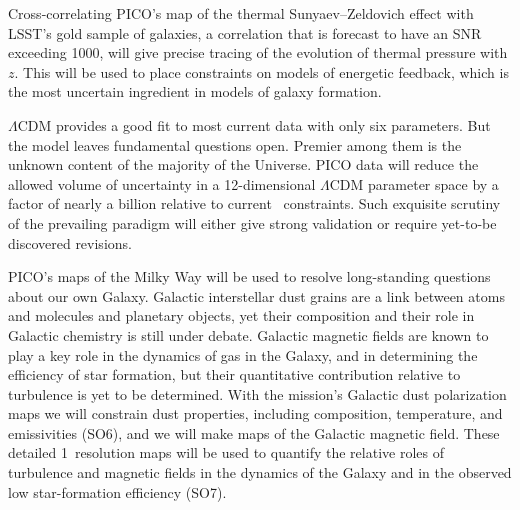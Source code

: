 \documentclass[PICOReport.tex]{subfiles}
\begin{document}
Cross-correlating PICO's map of the thermal Sunyaev--Zeldovich effect with LSST's gold sample of galaxies, a correlation that is forecast to have an \ac{SNR} exceeding 1000, will give precise tracing of the evolution of thermal pressure with $z$. This will be used to place constraints on models of energetic feedback, which is the most uncertain ingredient in models of galaxy formation. 


$\Lambda$CDM provides a good fit to most current data with only six parameters. But the model leaves fundamental questions open. Premier among them is the unknown content of the majority of the Universe. PICO data will reduce the allowed volume of uncertainty in a 12-dimensional $ \Lambda$CDM parameter space by a factor of nearly a billion relative to current \planck\ constraints. Such exquisite scrutiny of the prevailing paradigm will either give strong validation or require yet-to-be discovered revisions.

PICO's maps of the Milky Way will be used to resolve long-standing questions about our own Galaxy. Galactic interstellar dust grains are a link between atoms and molecules and planetary objects, yet their composition and their role in Galactic chemistry is still under debate. Galactic magnetic fields are known to play a key role in the dynamics of gas in the Galaxy, and in determining the efficiency of star formation, but their quantitative contribution relative to turbulence is yet to be determined. With the mission's Galactic dust polarization maps we will constrain dust properties, including composition, temperature, and emissivities (SO6), and we will make maps of the Galactic magnetic field. These detailed 1\arcmin\ resolution maps will be used to quantify the relative roles of turbulence and magnetic fields in the dynamics of the Galaxy and in the observed low star-formation efficiency (SO7). 
\end{document}
